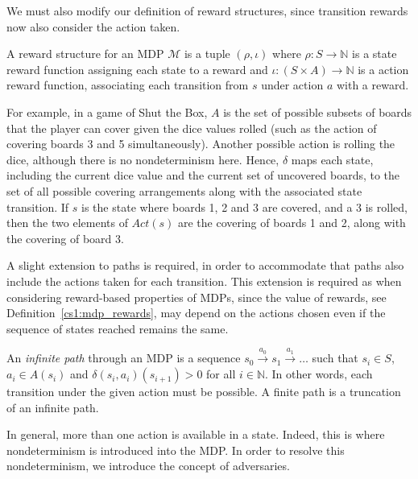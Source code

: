 We must also modify our definition of reward structures, since transition rewards now also consider the action taken.

\begin{definition}
\label{cs1:mdp_rewards}

A reward structure for an MDP $\mathcal{M}$ is a tuple $(\rho, \iota)$ where $\rho : S \rightarrow \mathbb{N}$ is a state reward function assigning each state to a reward and $\iota : (S {\times} A) \rightarrow \mathbb{N}$ is a action reward function, associating each transition from $s$ under action $a$ with a reward.
\end{definition}

For example, in a game of Shut the Box, $A$ is the set of possible subsets of boards that the player can cover given the dice values rolled (such as the action of covering boards 3 and 5 simultaneously). Another possible action is rolling the dice, although there is no nondeterminism here. Hence, $\delta$ maps each state, including the current dice value and the current set of uncovered boards, to the set of all possible covering arrangements along with the associated state transition. If $s$ is the state where boards 1, 2 and 3 are covered, and a 3 is rolled, then the two elements of $Act(s)$ are the covering of boards 1 and 2, along with the covering of board 3.

A slight extension to paths is required, in order to accommodate that paths also include the actions taken for each transition.  This extension is required as when considering reward-based properties of MDPs, since the value of rewards, see Definition~\ref{cs1:mdp_rewards}, may depend on the actions chosen even if the sequence of states reached remains the same. %

\begin{definition}
\label{cs1:mdp_paths}

An \emph{infinite path} through an MDP is a sequence $s_0 \xrightarrow{a_0} s_1 \xrightarrow{a_1} \dots$ such that $s_i \in S$, $a_i \in A(s_i)$ and $\delta(s_i,a_i)(s_{i+1}) > 0$ for all $i \in \mathbb{N}$. In other words, each transition under the given action must be possible. A finite path is a truncation of an infinite path.

\end{definition}


In general, more than one action is available in a state. Indeed, this is where nondeterminism is introduced into the MDP. In order to resolve this nondeterminism, we introduce the concept of adversaries.

